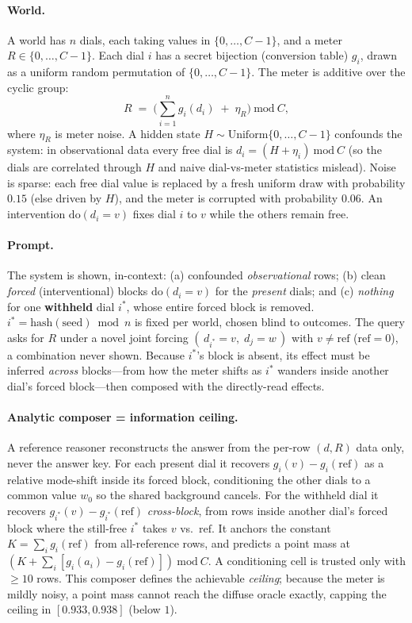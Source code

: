 \documentclass[11pt]{article}
\newcommand{\modC}{\ \mathrm{mod}\ C}
\newcommand{\istar}{i^{\!*}}
\begin{document}
\paragraph{World.} A world has $n$ dials, each taking values in $\{0,\dots,C-1\}$, and a meter
$R\in\{0,\dots,C-1\}$. Each dial $i$ has a secret bijection (conversion table) $g_i$, drawn as a uniform
random permutation of $\{0,\dots,C-1\}$. The meter is additive over the cyclic group:
\begin{equation}
R \;=\; \Big(\textstyle\sum_{i=1}^{n} g_i(d_i) \;+\; \eta_R\Big)\modC,
\end{equation}
where $\eta_R$ is meter noise. A hidden state $H\sim\mathrm{Uniform}\{0,\dots,C-1\}$ confounds the system:
in observational data every free dial is $d_i=(H+\eta_i)\modC$ (so the dials are correlated through $H$ and
naive dial-vs-meter statistics mislead). Noise is sparse: each free dial value is replaced by a fresh
uniform draw with probability $0.15$ (else driven by $H$), and the meter is corrupted with probability
$0.06$. An intervention $\mathrm{do}(d_i\!=\!v)$ fixes dial $i$ to $v$ while the others remain free.

\paragraph{Prompt.} The system is shown, in-context: (a) confounded \emph{observational} rows;
(b) clean \emph{forced} (interventional) blocks $\mathrm{do}(d_i\!=\!v)$ for the \emph{present} dials; and
(c) \emph{nothing} for one \textbf{withheld} dial $\istar$, whose entire forced block is removed.
$\istar=\mathrm{hash}(\text{seed})\bmod n$ is fixed per world, chosen blind to outcomes. The query asks for
$R$ under a novel joint forcing $(\,d_{\istar}\!=\!v,\;d_j\!=\!w\,)$ with $v\neq\mathrm{ref}$ ($\mathrm{ref}=0$),
a combination never shown. Because $\istar$'s block is absent, its effect must be inferred \emph{across}
blocks---from how the meter shifts as $\istar$ wanders inside another dial's forced block---then composed
with the directly-read effects.

\paragraph{Analytic composer = information ceiling.} A reference reasoner reconstructs the answer from the
per-row $(d,R)$ data only, never the answer key. For each present dial it recovers
$g_i(v)-g_i(\mathrm{ref})$ as a relative mode-shift inside its forced block, conditioning the other dials to
a common value $w_0$ so the shared background cancels. For the withheld dial it recovers
$g_{\istar}(v)-g_{\istar}(\mathrm{ref})$ \emph{cross-block}, from rows inside another dial's forced block
where the still-free $\istar$ takes $v$ vs.\ $\mathrm{ref}$. It anchors the constant
$K=\sum_i g_i(\mathrm{ref})$ from all-reference rows, and predicts a point mass at
$(K+\sum_i [g_i(a_i)-g_i(\mathrm{ref})])\modC$. A conditioning cell is trusted only with
$\geq\!10$ rows. This composer defines the achievable \emph{ceiling}; because the meter is mildly noisy, a
point mass cannot reach the diffuse oracle exactly, capping the ceiling in $[0.933,0.938]$ (below $1$).
\end{document}
